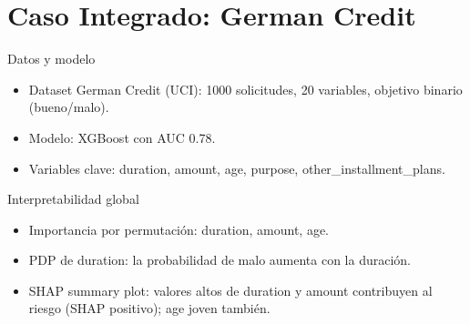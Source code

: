 \documentclass[aspectratio=169, 10pt, xcolor=table]{beamer}
\begin{document}
\section{Caso Integrado: German Credit}

\begin{frame}{Datos y modelo}
    \begin{itemize}
        \item Dataset German Credit (UCI): 1000 solicitudes, 20 variables, objetivo binario (bueno/malo).
        \item Modelo: XGBoost con AUC 0.78.
        \item Variables clave: duration, amount, age, purpose, other_installment_plans.
    \end{itemize}
\end{frame}

\begin{frame}{Interpretabilidad global}
    \begin{itemize}
        \item Importancia por permutación: duration, amount, age.
        \item PDP de duration: la probabilidad de malo aumenta con la duración.
        \item SHAP summary plot: valores altos de duration y amount contribuyen al riesgo (SHAP positivo); age joven también.
    \end{itemize}
\end{frame}
\end{document}
